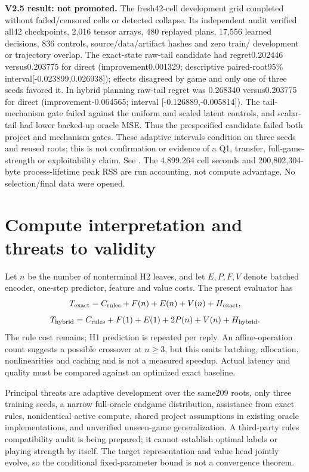 \documentclass[11pt,a4paper]{article}
\begin{document}
\textbf{V2.5 result: not promoted.} The fresh42-cell development grid completed
without failed/censored cells or detected collapse. Its independent audit
verified all42 checkpoints, 2,016 tensor arrays, 480 replayed plans, 17,556
learned decisions, 836 controls, source/data/artifact hashes and zero train/
development or trajectory overlap. The exact-state raw-tail candidate had
regret0.202446 versus0.203775 for direct (improvement0.001329; descriptive
paired-root95\% interval[-0.023899,0.026938]); effects disagreed by game and
only one of three seeds favored it. In hybrid planning raw-tail regret was
0.268340 versus0.203775 for direct (improvement-0.064565; interval
[-0.126889,-0.005814]). The tail-mechanism gate failed against the uniform and
scaled latent controls, and scalar-tail had lower backed-up oracle MSE. Thus
the prespecified candidate failed both project and mechanism gates. These
adaptive intervals condition on three seeds and reused roots; this is not
confirmation or evidence of a Q1, transfer, full-game-strength or exploitability
claim. See . The 4,899.264 cell seconds and
200,802,304-byte process-lifetime peak RSS are run accounting, not compute
advantage. No selection/final data were opened.

\section{Compute interpretation and threats to validity}
Let $n$ be the number of nonterminal H2 leaves, and let $E,P,F,V$ denote batched
encoder, one-step predictor, feature and value costs. The present evaluator has
\[
 T_{\rm exact}=C_{\rm rules}+F(n)+E(n)+V(n)+H_{\rm exact},
\]
\[
 T_{\rm hybrid}=C_{\rm rules}+F(1)+E(1)+2P(n)+V(n)+H_{\rm hybrid}.
\]
The rule cost remains; H1 prediction is repeated per reply. An affine-operation
count suggests a possible crossover at $n\ge3$, but this omits batching,
allocation, nonlinearities and caching and is not a measured speedup. Actual
latency and quality must be compared against an optimized exact baseline.

Principal threats are adaptive development over the same209 roots, only three
training seeds, a narrow full-oracle endgame distribution, assistance from exact
rules, nonidentical active compute, shared project assumptions in existing
oracle implementations, and unverified unseen-game generalization. A third-party
rules compatibility audit is being prepared; it cannot establish optimal labels
or playing strength by itself. The target representation and value head jointly
evolve, so the conditional fixed-parameter bound is not a convergence theorem.
\end{document}
